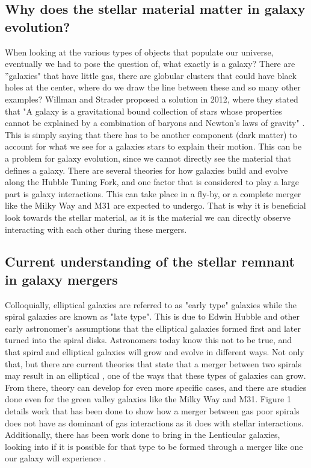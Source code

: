 \documentclass[twocolumn]{aastex63}
\begin{document}
\subsection{Why does the stellar material matter in galaxy evolution?}
When looking at the various types of objects that populate our universe, eventually we had to pose the question of, what exactly is a galaxy? There are ''galaxies" that have little gas, there are globular clusters that could have black holes at the center, where do we draw the line between these and so many other examples? Willman and Strader proposed a solution in 2012, where they stated that "A galaxy is a gravitational bound collection of stars whose properties cannot be explained by a combination of baryons and Newton's laws of gravity" \citep{2012AJ....144...76W}. This is simply saying that there has to be another component (dark matter) to account for what we see for a galaxies stars to explain their motion. This can be a problem for galaxy evolution, since we cannot directly see the material that defines a galaxy. There are several theories for how galaxies build and evolve along the Hubble Tuning Fork, and one factor that is considered to play a large part is galaxy interactions. This can take place in a fly-by, or a complete merger like the Milky Way and M31 are expected to undergo. That is why it is beneficial look towards the stellar material, as it is the material we can directly observe interacting with each other during these mergers.


\subsection{Current understanding of the stellar remnant in galaxy mergers}
Colloquially, elliptical galaxies are referred to as "early type" galaxies while the spiral galaxies are known as "late type". This is due to Edwin Hubble and other early astronomer's assumptions that the elliptical galaxies formed first and later turned into the spiral disks. Astronomers today know this not to be true, and that spiral and elliptical galaxies will grow and evolve in different ways. Not only that, but there are current theories that state that a merger between two spirals may result in an elliptical \citep{1992ARA&A..30..705B}, one of the ways that these types of galaxies can grow. From there, theory can develop for even more specific cases, and there are studies done even for the green valley galaxies like the Milky Way and M31. Figure 1 details work that has been done to show how a merger between gas poor spirals does not have as dominant of gas interactions as it does with stellar interactions. Additionally, there has been work done to bring in the Lenticular galaxies, looking into if it is possible for that type to be formed through a merger like one our galaxy will experience \citep{2020MNRAS.492.2955C}. 
\end{document}
